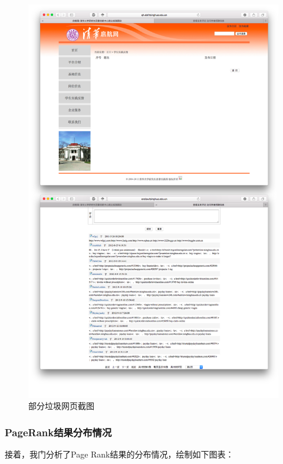 \documentclass[paper=a4, fontsize=11pt, UTF8]{article} %
\numberwithin{equation}{section} %
\numberwithin{figure}{section} %
\numberwithin{table}{section} %
\begin{document}
\begin{figure}[htp]
\center
\includegraphics[width=\textwidth]{ss0}
\caption{部分垃圾网页截图} \label{ss0}
\end{figure}

\newpage

\subsubsection{PageRank结果分布情况}

接着，我门分析了Page Rank结果的分布情况，绘制如下图表：
\end{document}
